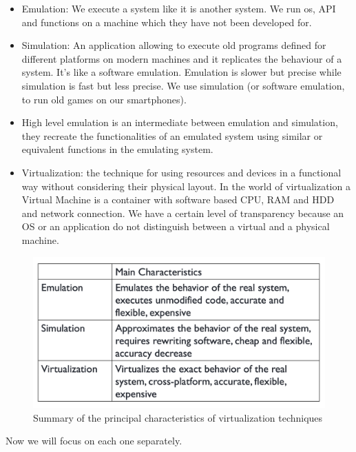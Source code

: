 \begin{itemize}
    \item Emulation: We execute a system like it is another system. We run os, API and functions on a machine which they have not been developed for.
    \item Simulation: An application allowing to execute old programs defined for different platforms on modern machines and it replicates the behaviour of a system. It's like a software emulation. \n
    Emulation is slower but precise while simulation is fast but less precise. We use simulation (or software emulation, to run old games on our smartphones).
    \item High level emulation is an intermediate between emulation and simulation, they recreate the functionalities of an emulated system using similar or equivalent functions in the emulating system.
    \item Virtualization: the technique for using resources and devices in a functional way without considering their physical layout. \n
    In the world of virtualization a Virtual Machine is a container with software based CPU, RAM and HDD and network connection. We have a certain level of transparency because an OS or an application do not distinguish between a virtual and a physical machine.
\end{itemize}
\begin{figure}
    \centering
    \includegraphics[scale=0.4]{./Images/summary_virtualization.png}
    \caption{Summary of the principal characteristics of virtualization techniques}
\end{figure}
Now we will focus on each one separately.
